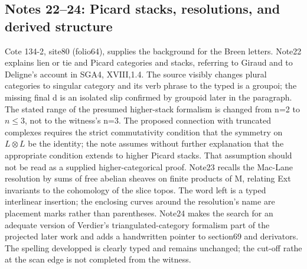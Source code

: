 \documentclass[10pt,oneside]{book}
\begin{document}
\subsection*{Notes 22--24: Picard stacks, resolutions, and derived structure}
Cote 134-2, site80 (folio64), supplies the background for the Breen letters. Note22 explains lien or tie and Picard categories and stacks, referring to Giraud and to Deligne's account in SGA4, XVIII,1.4. The source visibly changes plural categories to singular category and its verb phrase to the typed is a groupoi; the missing final d is an isolated slip confirmed by groupoid later in the paragraph. The stated range of the presumed higher-stack formalism is changed from n=2 to $n\leq3$, not to the witness's n=3. The proposed connection with truncated complexes requires the strict commutativity condition that the symmetry on $L\otimes L$ be the identity; the note assumes without further explanation that the appropriate condition extends to higher Picard stacks. That assumption should not be read as a supplied higher-categorical proof. Note23 recalls the Mac-Lane resolution by sums of free abelian sheaves on finite products of M, relating Ext invariants to the cohomology of the slice topos. The word left is a typed interlinear insertion; the enclosing curves around the resolution's name are placement marks rather than parentheses. Note24 makes the search for an adequate version of Verdier's triangulated-category formalism part of the projected later work and adds a handwritten pointer to section69 and derivators. The spelling developped is clearly typed and remains unchanged; the cut-off rathe at the scan edge is not completed from the witness.
\end{document}
